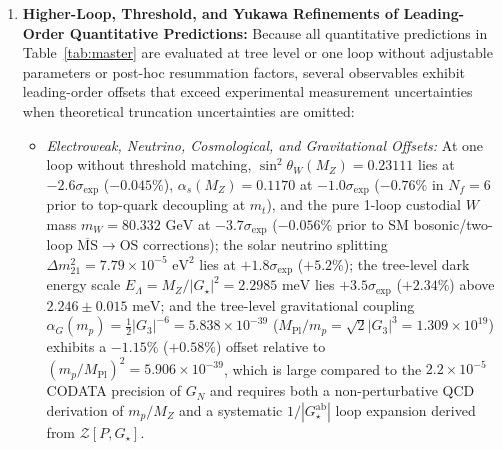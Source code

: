 \documentclass[11pt,a4paper]{article}
\theoremstyle{definition}
\theoremstyle{remark}
\newcommand{\Gthree}{G_3}
\newcommand{\Gstar}{G_\star}
\begin{document}
\begin{enumerate}
    \item \textbf{Higher-Loop, Threshold, and Yukawa Refinements of Leading-Order Quantitative Predictions:}
    Because all quantitative predictions in Table~\ref{tab:master} are evaluated at tree level or one loop without adjustable parameters or post-hoc resummation factors, several observables exhibit leading-order offsets that exceed experimental measurement uncertainties when theoretical truncation uncertainties are omitted:
    \begin{itemize}
        \item \emph{Electroweak, Neutrino, Cosmological, and Gravitational Offsets:} At one loop without threshold matching, $\sin^2\theta_W(M_Z) = 0.23111$ lies at $-2.6\sigma_{\mathrm{exp}}$ ($-0.045\%$), $\alpha_s(M_Z) = 0.1170$ at $-1.0\sigma_{\mathrm{exp}}$ ($-0.76\%$ in $N_f = 6$ prior to top-quark decoupling at $m_t$), and the pure 1-loop custodial $W$ mass $m_W = 80.332\text{ GeV}$ at $-3.7\sigma_{\mathrm{exp}}$ ($-0.056\%$ prior to SM bosonic/two-loop $\overline{\mathrm{MS}}\to\text{OS}$ corrections); the solar neutrino splitting $\Delta m_{21}^2 = 7.79 \times 10^{-5}\text{ eV}^2$ lies at $+1.8\sigma_{\mathrm{exp}}$ ($+5.2\%$); the tree-level dark energy scale $E_\Lambda = M_Z / |\Gstar|^2 = 2.2985\text{ meV}$ lies $+3.5\sigma_{\mathrm{exp}}$ ($+2.34\%$) above $2.246 \pm 0.015\text{ meV}$; and the tree-level gravitational coupling $\alpha_G(m_p) = \frac{1}{2}|\Gthree|^{-6} = 5.838 \times 10^{-39}$ ($M_{\mathrm{Pl}}/m_p = \sqrt{2}|\Gthree|^3 = 1.309 \times 10^{19}$) exhibits a $-1.15\%$ ($+0.58\%$) offset relative to $(m_p/M_{\mathrm{Pl}})^2 = 5.906 \times 10^{-39}$, which is large compared to the $2.2 \times 10^{-5}$ CODATA precision of $G_N$ and requires both a non-perturbative QCD derivation of $m_p/M_Z$ and a systematic $1/|\Gstar^{\mathrm{ab}}|$ loop expansion derived from $\mathcal{Z}[P, \Gstar]$.

\end{itemize}
\end{enumerate}
\end{document}
